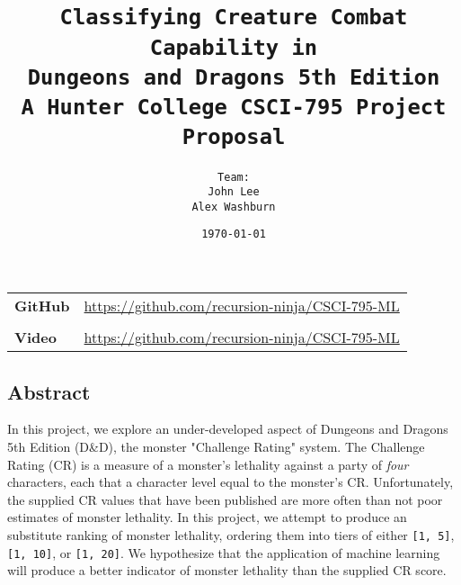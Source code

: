 \documentclass[12pt]{diazessay}
\title{\texttt{\LARGE{Classifying Creature Combat Capability in \\Dungeons and Dragons 5th Edition} \\\vspace{1em} {\large A Hunter College CSCI-795 Project Proposal}}} %
\author{\texttt{{\Huge Team:}\\\vspace*{-0.5em}
		John Lee \\\vspace*{-0.25em}
		Alex Washburn}} %
\date{\texttt{\today}} %
\begin{document}
	

\maketitle %

	
\pagebreak


\clearpage


\vspace*{\fill}
\begin{center}
	\begin{minipage}{.75\textwidth}
		
\tableofcontents
\vspace*{0.5cm}
\begin{longtable}[]{@{}lc@{}}
{\bfseries GitHub} & \url{https://github.com/recursion-ninja/CSCI-795-ML} \\
& \\
{\bfseries Video } & \url{https://github.com/recursion-ninja/CSCI-795-ML} \\
\end{longtable}
		
	\end{minipage}
\end{center}
\vfill %
\clearpage


\pagebreak


\clearpage
\vspace*{\fill}
\begin{center}
	\begin{minipage}{.9\textwidth}
\hypertarget{abstract}{%
\section{Abstract}\label{abstract}}

In this project, we explore an under-developed aspect of Dungeons and
Dragons 5th Edition (D\&D), the monster "Challenge Rating" system. The
Challenge Rating (CR) is a measure of a monster's lethality against a
party of \emph{four} characters, each that a character level equal to
the monster's CR. Unfortunately, the supplied CR values that have been
published are more often than not poor estimates of monster lethality.
In this project, we attempt to produce an substitute ranking of monster
lethality, ordering them into tiers of either \texttt{{[}1,\ 5{]}},
\texttt{{[}1,\ 10{]}}, or \texttt{{[}1,\ 20{]}}. We hypothesize that the
application of machine learning will produce a better indicator of
monster lethality than the supplied CR score.
	\end{minipage}
\end{center}
\vfill %
\clearpage
\pagebreak
\end{document}
